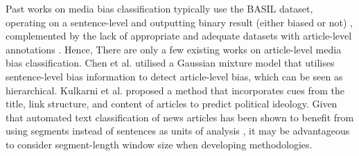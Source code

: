 Past works on media bias classification typically use the BASIL dataset, operating on a sentence-level and outputting binary result (either biased or not) \cite{maab-2023-lexical-bias-detection, maab-2023-target-aware, guo-2022-modeling, van-den-berg-2020-context,lee-2021-unifying,lei-2022-sentence,lei-2024-event-relation}, complemented by the lack of appropriate and adequate datasets with article-level annotations \cite{demidov-2023-political-bias-classification}. Hence, There are only a few existing works on article-level media bias classification. Chen et al. \cite{chen-2020-detecting-media-bias-gaussian} utilised a Gaussian mixture model that utilises sentence-level bias information to detect article-level bias, which can be seen as hierarchical. Kulkarni et al. \cite{kulkarni-2018-multi-view} proposed a method that incorporates cues from the title, link structure, and content of articles to predict political ideology. Given that automated text classification of news articles has been shown to benefit from using segments instead of sentences as units of analysis \cite{barbera-2021-article-classification}, it may be advantageous to consider segment-length window size when developing methodologies.

